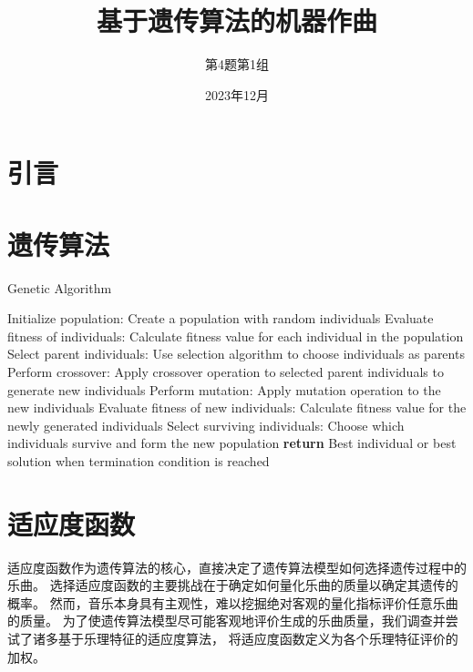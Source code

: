\documentclass{article}
\title{基于遗传算法的机器作曲}
\author{第4题第1组}
\date{2023年12月}
\begin{document}
\maketitle
\begin{abstract}
    
\end{abstract}
\newpage
\tableofcontents
\newpage
{}
\section{引言}
\newpage
\section{遗传算法}
\begin{algorithm}
    \caption{Genetic Algorithm}
    \begin{algorithmic}[1]
    \STATE Initialize population:
        \STATE Create a population with random individuals
    \STATE Evaluate fitness of individuals:
        \STATE Calculate fitness value for each individual in the population
    \REPEAT
        \STATE Select parent individuals:
            \STATE Use selection algorithm to choose individuals as parents
        \STATE Perform crossover:
            \STATE Apply crossover operation to selected parent individuals to generate new individuals
        \STATE Perform mutation:
            \STATE Apply mutation operation to the new individuals
        \STATE Evaluate fitness of new individuals:
            \STATE Calculate fitness value for the newly generated individuals
        \STATE Select surviving individuals:
            \STATE Choose which individuals survive and form the new population
    \STATE \textbf{return} Best individual or best solution when termination condition is reached
    \end{algorithmic}
    \end{algorithm}


\newpage
\section{适应度函数}
适应度函数作为遗传算法的核心，直接决定了遗传算法模型如何选择遗传过程中的乐曲。
选择适应度函数的主要挑战在于确定如何量化乐曲的质量以确定其遗传的概率。
然而，音乐本身具有主观性，难以挖掘绝对客观的量化指标评价任意乐曲的质量。
为了使遗传算法模型尽可能客观地评价生成的乐曲质量，我们调查并尝试了诸多基于乐理特征的适应度算法，
将适应度函数定义为各个乐理特征评价的加权。
\end{document}

